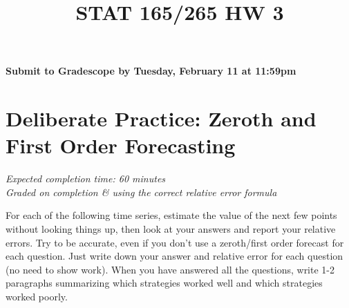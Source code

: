 \documentclass[11pt]{article}
\title{STAT 165/265 HW 3}
\begin{document}
\maketitle

\hfill \textbf{Submit to Gradescope by Tuesday, February 11 at 11:59pm}
\section*{Deliberate Practice: Zeroth and First Order Forecasting}

\emph{Expected completion time: 60 minutes} \\
\emph{Graded on completion \& using the correct relative error formula}

For each of the following time series, estimate the value of the next few points without looking things up, then look at your answers and report your relative errors. Try to be accurate, even if you don't use a zeroth/first order forecast for each question. Just write down your answer and relative error for each question (no need to show work). When you have answered all the questions, write 1-2 paragraphs summarizing which strategies worked well and which strategies worked poorly.
\end{document}
